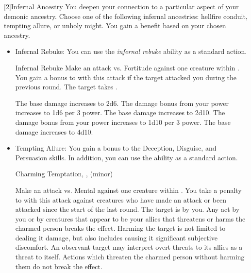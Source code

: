             [2]{Infernal Ancestry} You deepen your connection to a particular aspect of your demonic ancestry.
            Choose one of the following infernal ancestries: hellfire conduit, tempting allure, or unholy might.
            You gain a benefit based on your chosen ancestry.
            \begin{itemize}
                \item Infernal Rebuke: You can use the \textit{infernal rebuke} ability as a standard action.
                    \begin{magicalactiveability}{Infernal Rebuke}
                        \rankline
                        Make an attack vs. Fortitude against one creature within \shortrange.
                        You gain a  bonus to  with this attack if the target attacked you during the previous round.
                        \hit The target takes .

                        \rankline
                         The base damage increases to 2d6.
                         The damage bonus from your power increases to 1d6 per 3 power.
                         The base damage increases to 2d10.
                         The damage bonus from your power increases to 1d10 per 3 power.
                         The base damage increases to 4d10.
                    \end{magicalactiveability}
                \item Tempting Allure: You gain a  bonus to the Deception, Disguise, and Persuasion skills.
                    In addition, you can use the  ability as a standard action.
                    \begin{magicalsustainability}{Charming Temptation}{, ,  (minor)}
                        \rankline
                        \noindent

                        Make an attack vs. Mental against one creature within \medrange.
                        You take a  penalty to  with this attack against creatures who have made an attack or been attacked since the start of the last round.
                        \vspace{0.25em}
                        \hit The target is \charmed by you.
                        Any act by you or by creatures that appear to be your allies that threatens or harms the charmed person breaks the effect.
                        Harming the target is not limited to dealing it damage, but also includes causing it significant subjective discomfort.
                        An observant target may interpret overt threats to its allies as a threat to itself.
                        \crit Actions which threaten the charmed person without harming them do not break the effect.


\end{magicalsustainability}
\end{itemize}
